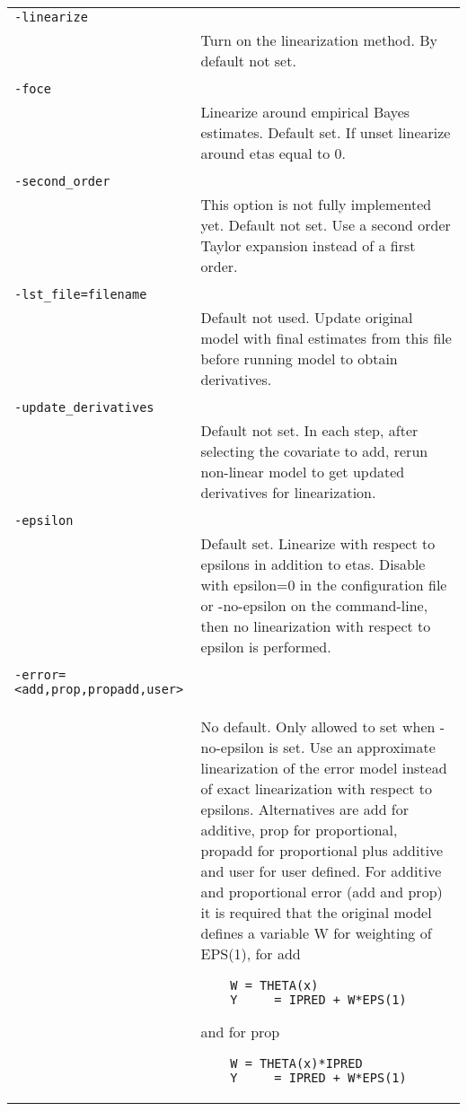 \documentclass[a4paper,12pt]{article}
\begin{document}
\begin{longtable}{p{1in}p{4in}}
\verb|-linearize| & \\
\nopagebreak
 & Turn on the linearization method. By default not set. \\
\\
\verb|-foce| & \\
\nopagebreak
 & Linearize around empirical Bayes estimates. Default set. If unset  linearize around etas equal to 0. \\
\\
\verb|-second_order| & \\
\nopagebreak
 & This option is not fully implemented yet. Default not set. Use a second order Taylor expansion instead of a first order. \\
\\
\verb|-lst_file=filename| & \\
\nopagebreak
 & Default not used. Update original model with final estimates from this file before running model to obtain derivatives. \\
\\
\verb|-update_derivatives| & \\
\nopagebreak
 & Default not set. In each step, after selecting the covariate to add, rerun non-linear model to get updated derivatives for linearization. \\
\\
\verb|-epsilon| & \\
\nopagebreak
 & Default set. Linearize with respect to epsilons in addition to etas. Disable with epsilon=0 in the configuration file or -no-epsilon on the command-line, then no linearization with respect to epsilon is performed. \\
\\
\verb|-error=<add,prop,propadd,user>| & \\
\nopagebreak
 & No default. Only allowed to set when -no-epsilon is set. Use an approximate linearization of the error model instead of exact linearization with respect to epsilons. Alternatives are add for additive, prop for proportional, propadd for proportional plus additive and user for user defined. 
For additive and proportional error (add and prop) it is required that the original model defines a variable W for weighting of EPS(1), for add
\begin{verbatim}
    W = THETA(x)
    Y     = IPRED + W*EPS(1)
\end{verbatim}
and for prop
\begin{verbatim}
    W = THETA(x)*IPRED
    Y     = IPRED + W*EPS(1)
\end{verbatim}


\end{longtable}
\end{document}
